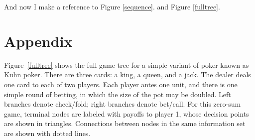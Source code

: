 \documentclass[11pt]{article}
\begin{document}
And now I make a reference to Figure \ref{sequence}. and Figure \ref{fulltree}.


\section{Appendix}
Figure~\ref{fulltree} shows the full game tree for a simple variant of poker known as Kuhn poker.  There are three cards: a king, a queen, and a jack.  The dealer deals one card to each of two players.  Each player antes one unit, and there is one simple round of betting, in which the size of the pot may be doubled.  Left branches denote check/fold; right branches denote bet/call.  For this zero-sum game, terminal nodes are labeled with payoffs to player 1, whose decision points are shown in triangles.  Connections between nodes in the same information set are shown with dotted lines.
\end{document}

